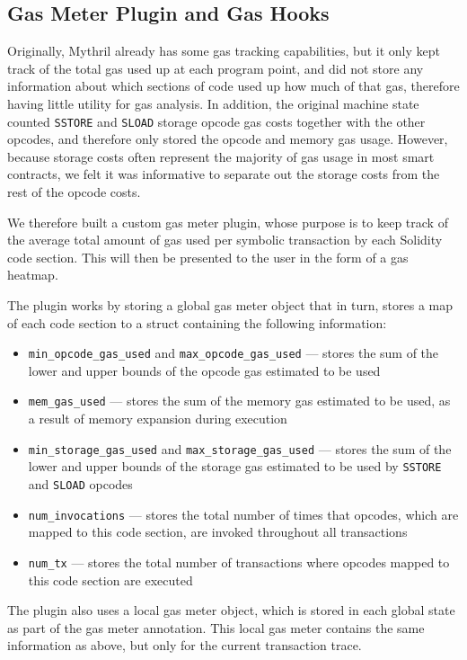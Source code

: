\subsection{Gas Meter Plugin and Gas Hooks}

Originally, Mythril already has some gas tracking
capabilities, but it only kept track of the total gas used up at each program point,
and did not store any information about which sections of code used up how much of that gas,
therefore having little utility for gas analysis. In addition, the original machine state
counted \texttt{SSTORE} and \texttt{SLOAD} storage opcode gas costs together with the other opcodes,
and therefore only stored the opcode and memory gas usage. However, because storage costs
often represent the majority of gas usage in most smart contracts, we felt it was 
informative to separate out the storage costs from the rest of the opcode costs.
 
We therefore built a custom gas meter plugin, whose purpose is to keep track of the average total amount of gas 
used per symbolic transaction by each Solidity code section. This will then be presented to 
the user in the form of a gas heatmap. 

The plugin works by storing a global gas meter object that in turn,
stores a map of each code section to a struct containing the following information:

\begin{itemize}
  \item \texttt{min_opcode_gas_used} and \texttt{max_opcode_gas_used} --- stores the sum of the lower
  and upper bounds of the opcode gas estimated to be used
  \item \texttt{mem_gas_used} --- stores the sum of the memory gas estimated to be used,
  as a result of memory expansion during execution
  \item \texttt{min_storage_gas_used} and \texttt{max_storage_gas_used} --- stores the sum of the lower
  and upper bounds of the storage gas estimated to be used by \texttt{SSTORE} and \texttt{SLOAD} opcodes
  \item \texttt{num_invocations} --- stores the total number of times that opcodes, which are mapped to this code
  section, are invoked throughout all transactions
  \item \texttt{num_tx} --- stores the total number of transactions where opcodes mapped to this
  code section are executed
\end{itemize}

The plugin also uses a local gas meter object, which is stored in each global state as part of 
the gas meter annotation.
This local gas meter contains the same information as above, but only for the current transaction trace.


